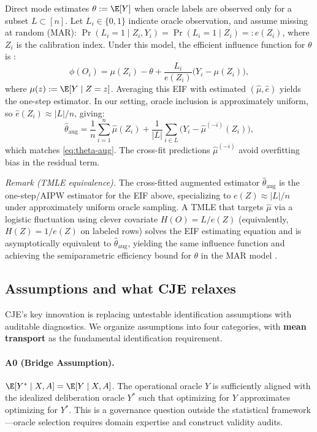 Direct mode estimates $\theta := \E[Y]$ when oracle labels are observed only for a subset $L \subset [n]$.
Let $L_i \in \{0,1\}$ indicate oracle observation, and assume missing at random (MAR):
$\Pr(L_i=1 \mid Z_i, Y_i) = \Pr(L_i=1 \mid Z_i) =: e(Z_i)$, where $Z_i$ is the calibration index.
Under this model, the efficient influence function for $\theta$ is \citep{Tsiatis2006,BangRobins2005}:
\[
  \phi(O_i) = \mu(Z_i) - \theta + \frac{L_i}{e(Z_i)}\bigl(Y_i - \mu(Z_i)\bigr),
\]
where $\mu(z) := \E[Y \mid Z=z]$.
Averaging this EIF with estimated $(\hat\mu, \hat e)$ yields the one-step estimator.
In our setting, oracle inclusion is approximately uniform, so $\hat e(Z_i) \approx |L|/n$, giving:
\[
  \hat\theta_{\mathrm{aug}} = \frac{1}{n}\sum_{i=1}^n \hat\mu(Z_i) + \frac{1}{|L|}\sum_{i \in L}\bigl(Y_i - \hat\mu^{(-i)}(Z_i)\bigr),
\]
which matches \cref{eq:theta-aug}. The cross-fit predictions $\hat\mu^{(-i)}$ avoid overfitting bias in the residual term.

\emph{Remark (TMLE equivalence).} The cross-fitted augmented estimator $\hat\theta_{\mathrm{aug}}$ is the one-step/AIPW estimator for the EIF above, specializing to $e(Z) \approx |L|/n$ under approximately uniform oracle sampling. A TMLE that targets $\hat\mu$ via a logistic fluctuation using clever covariate $H(O) = L/e(Z)$ (equivalently, $H(Z) = 1/e(Z)$ on labeled rows) solves the EIF estimating equation and is asymptotically equivalent to $\hat\theta_{\mathrm{aug}}$, yielding the same influence function and achieving the semiparametric efficiency bound for $\theta$ in the MAR model \citep{vanDerLaanRose2011TL}.

\subsection{Assumptions and what CJE relaxes}
\label{app:assumptions-ledger}

CJE's key innovation is replacing untestable identification assumptions with auditable diagnostics. We organize assumptions into four categories, with \textbf{mean transport} as the fundamental identification requirement.

\paragraph{A0 (Bridge Assumption).}
$\E[Y^* \mid X, A] = \E[Y \mid X, A]$. The operational oracle $Y$ is sufficiently aligned with the idealized deliberation oracle $Y^*$ such that optimizing for $Y$ approximates optimizing for $Y^*$. This is a governance question outside the statistical framework---oracle selection requires domain expertise and construct validity audits.

